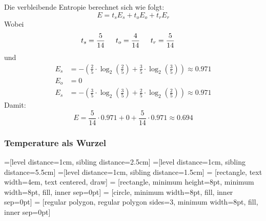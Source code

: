 \documentclass{article}
\begin{document}
Die verbleibende Entropie berechnet sich wie folgt:
$$
E = t_{s}E_{s} + t_{o}E_{o} + t_{r}E_{r}
$$
Wobei
\begin{align*}
t_{s} = \frac{5}{14}\hspace{1.5em}
t_{o} = \frac{4}{14}\hspace{1.5em}
t_{r} = \frac{5}{14}\hspace{1.5em}
\end{align*}
und
\begin{align*}
E_{s} &= - \left( \frac{2}{5} \cdot \log_2(\frac{2}{5}) + \frac{3}{5} \cdot \log_2(\frac{3}{5})  \right) \approx 0.971\\
E_{o} &= 0\\
E_{s} &= - \left( \frac{3}{5} \cdot \log_2(\frac{3}{5}) + \frac{2}{5} \cdot \log_2(\frac{2}{5})  \right) \approx 0.971
\end{align*}
Damit:
$$
E = \frac{5}{14} \cdot 0.971 + 0 + \frac{5}{14} \cdot 0.971 \approx 0.694
$$


\subsubsection*{Temperature als Wurzel}
=[level distance=1cm, sibling distance=2.5cm]
=[level distance=1cm, sibling distance=5.5cm]
=[level distance=1cm, sibling distance=1.5cm]
 = [rectangle, text width=4em, text centered, draw]
 = [rectangle, minimum height=8pt, minimum width=8pt, fill, inner sep=0pt]
 = [circle, minimum width=8pt, fill, inner sep=0pt]
 = [regular polygon, regular polygon sides=3, minimum width=8pt, fill, inner sep=0pt]
\end{document}
